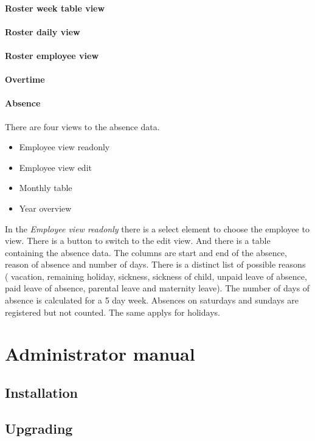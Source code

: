 \documentclass[12pt,a4paper,titlepage]{book}
\begin{document}
\subsubsection{Roster week table view}
\subsubsection{Roster daily view}
\subsubsection{Roster employee view}
\subsubsection{Overtime}
\subsubsection{Absence}
There are four views to the absence data.
\begin{itemize}
\item Employee view readonly
\item Employee view edit
\item Monthly table
\item Year overview
\end{itemize}
In the \emph{Employee view readonly} there is a select element to choose the employee to view. There is a button to switch to the edit view.
And there is a table containing the absence data. The columns are start and end of the absence, reason of absence and number of days.
There is a distinct list of possible reasons ( vacation,
        remaining holiday,
       sickness,
        sickness of child,
        unpaid leave of absence,
        paid leave of absence,
        parental leave and
        maternity leave).
The number of days of absence is calculated for a 5 day week. Absences on saturdays and sundays are registered but not counted. The same applys for holidays.


\chapter{Administrator manual}
\section{Installation}
\section{Upgrading}
\end{document}
